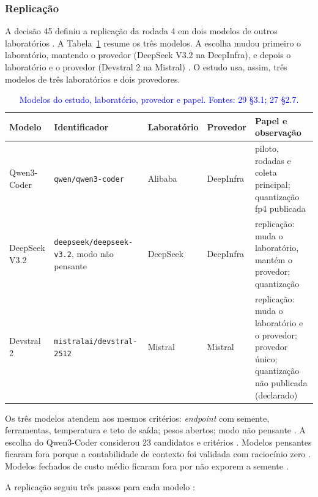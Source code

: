 \begin{novobloco}
\subsubsection{Replicação}

A decisão 45 definiu a replicação da rodada 4 em dois modelos de outros laboratórios . A Tabela~\ref{tab-modelos} resume os três modelos. A escolha mudou primeiro o laboratório, mantendo o provedor (DeepSeek V3.2 na DeepInfra), e depois o laboratório e o provedor (Devstral 2 na Mistral) . O estudo usa, assim, três modelos de três laboratórios e dois provedores.

\begin{table}[t]
\centering
\color{blue}
\caption{\textcolor{blue}{Modelos do estudo, laboratório, provedor e papel. Fontes: 29 \S3.1; 27 \S2.7.}}
\label{tab-modelos}
\small
\begin{tabular}{p{2.0cm}p{4.3cm}p{1.8cm}p{1.6cm}p{4.4cm}}
\toprule
Modelo & Identificador & Laboratório & Provedor & Papel e observação \\
\midrule
Qwen3-Coder & \texttt{qwen/qwen3-coder} & Alibaba & DeepInfra & piloto, rodadas e coleta principal; quantização fp4 publicada \\
DeepSeek V3.2 & \texttt{deepseek/deepseek-v3.2}, modo não pensante & DeepSeek & DeepInfra & replicação: muda o laboratório, mantém o provedor; quantização \pedir{} \\
Devstral 2 & \texttt{mistralai/devstral-2512} & Mistral & Mistral & replicação: muda o laboratório e o provedor; provedor único; quantização não publicada (declarado) \\
\bottomrule
\end{tabular}
\end{table}

Os três modelos atendem aos mesmos critérios: \textit{endpoint} com semente, ferramentas, temperatura e teto de saída; pesos abertos; modo não pensante . A escolha do Qwen3-Coder considerou 23 candidatos e  critérios . Modelos pensantes ficaram fora porque a contabilidade de contexto foi validada com raciocínio zero . Modelos fechados de custo médio ficaram fora por não exporem a semente .

A replicação seguiu três passos para cada modelo :


\end{novobloco}
